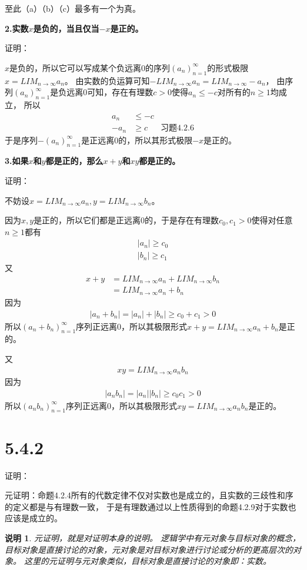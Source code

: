 \documentclass{article}
\theoremstyle{mystyle}
\newtheorem*{zremark}{说明}
\begin{document}
至此（a）（b）（c）最多有一个为真。

\textbf{2.实数$x$是负的，当且仅当$-x$是正的。}

证明：

$x$是负的，所以它可以写成某个负远离0的序列$(a_n)_{n=1}^\infty$的形式极限$x=LIM_{n\rightarrow \infty}a_n$。
由实数的负运算可知$-LIM_{n\rightarrow \infty}a_n = LIM_{n \rightarrow \infty}-a_n$，
由序列$(a_n)_{n=1}^\infty$是负远离0可知，存在有理数$c > 0$使得$a_n \leq -c$对所有的$n \geq 1$均成立，
所以
\begin{align*}
  a_n  & \leq -c                  \\
  -a_n & \geq c  & \text{习题4.2.6}
\end{align*}
于是序列$-(a_n)_{n=1}^\infty$是正远离0的，所以其形式极限$-x$是正的。

\textbf{3.如果$x$和$y$都是正的，那么$x+y$和$xy$都是正的。}

证明：

不妨设$x=LIM_{n \rightarrow \infty}a_n, y = LIM_{n \rightarrow \infty}b_n$。

因为$x,y$是正的，所以它们都是正远离0的，于是存在有理数$c_0,c_1 > 0$使得对任意$n \geq 1$都有
\begin{align}
  |a_n| \geq c_0 \\
  |b_n| \geq c_1
\end{align}
又
\begin{align*}
  x + y & = LIM_{n \rightarrow \infty}a_n + LIM_{n \rightarrow \infty}b_n \\
        & = LIM_{n \rightarrow \infty} a_n + b_n
\end{align*}
因为
\begin{align*}
  |a_n + b_n| = |a_n| + |b_n| \geq c_0 + c_1 > 0
\end{align*}
所以$(a_n+b_n)_{n=1}^\infty$序列正远离0，所以其极限形式$x+y=LIM_{n \rightarrow \infty} a_n + b_n$是正的。

又
\begin{align*}
  xy = LIM_{n \rightarrow \infty} a_nb_n
\end{align*}
因为
\begin{align*}
  |a_nb_n| = |a_n||b_n| \geq c_0c_1 > 0
\end{align*}
所以$(a_nb_n)_{n=1}^\infty$序列正远离0，所以其极限形式$xy=LIM_{n \rightarrow \infty} a_nb_n$是正的。

\section*{5.4.2}

证明：

元证明：命题4.2.4所有的代数定律不仅对实数也是成立的，且实数的三歧性和序的定义都是与有理数一致，
于是有理数通过以上性质得到的命题4.2.9对于实数也应该是成立的。

\begin{zgraytheorem}
  \begin{zremark}
    元证明，就是对证明本身的说明。
    逻辑学中有元对象与目标对象的概念，目标对象是直接讨论的对象，元对象是对目标对象进行讨论或分析的更高层次的对象。
    这里的元证明与元对象类似，目标对象是直接讨论的对象即：实数。
  \end{zremark}
\end{zgraytheorem}
\end{document}
